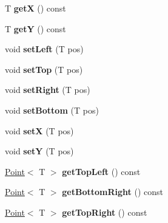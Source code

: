 \begin{DoxyCompactItemize}
\item 
\hypertarget{class_box_ad87b7a84b19926fe60db12ce46624cbb}{
T {\bfseries getX} () const }
\label{class_box_ad87b7a84b19926fe60db12ce46624cbb}

\item 
\hypertarget{class_box_ae2adebcecdde285e7edb0c913ab7ab84}{
T {\bfseries getY} () const }
\label{class_box_ae2adebcecdde285e7edb0c913ab7ab84}

\item 
\hypertarget{class_box_a300fcec469048ac543910beac79daaa2}{
void {\bfseries setLeft} (T pos)}
\label{class_box_a300fcec469048ac543910beac79daaa2}

\item 
\hypertarget{class_box_a9e5e2f4b7268a52906ebd441a79d5bdd}{
void {\bfseries setTop} (T pos)}
\label{class_box_a9e5e2f4b7268a52906ebd441a79d5bdd}

\item 
\hypertarget{class_box_a037ab25102c5bf2d050282ed35d6a312}{
void {\bfseries setRight} (T pos)}
\label{class_box_a037ab25102c5bf2d050282ed35d6a312}

\item 
\hypertarget{class_box_ac5d43338470ef5bfab770786b170f454}{
void {\bfseries setBottom} (T pos)}
\label{class_box_ac5d43338470ef5bfab770786b170f454}

\item 
\hypertarget{class_box_a4dcb975c536439998d7f6c0fc47b2358}{
void {\bfseries setX} (T pos)}
\label{class_box_a4dcb975c536439998d7f6c0fc47b2358}

\item 
\hypertarget{class_box_a976594b18e7c135903607265a14ba783}{
void {\bfseries setY} (T pos)}
\label{class_box_a976594b18e7c135903607265a14ba783}

\item 
\hypertarget{class_box_ac0f698d9054c81ce3f0b9e45b208aa83}{
\hyperlink{class_point}{Point}$<$ T $>$ {\bfseries getTopLeft} () const }
\label{class_box_ac0f698d9054c81ce3f0b9e45b208aa83}

\item 
\hypertarget{class_box_a1cbff4ee05e798b43cda5ca603d004e7}{
\hyperlink{class_point}{Point}$<$ T $>$ {\bfseries getBottomRight} () const }
\label{class_box_a1cbff4ee05e798b43cda5ca603d004e7}

\item 
\hypertarget{class_box_a61afdde64f205f189aeff219bac2db24}{
\hyperlink{class_point}{Point}$<$ T $>$ {\bfseries getTopRight} () const }
\label{class_box_a61afdde64f205f189aeff219bac2db24}


\end{DoxyCompactItemize}
